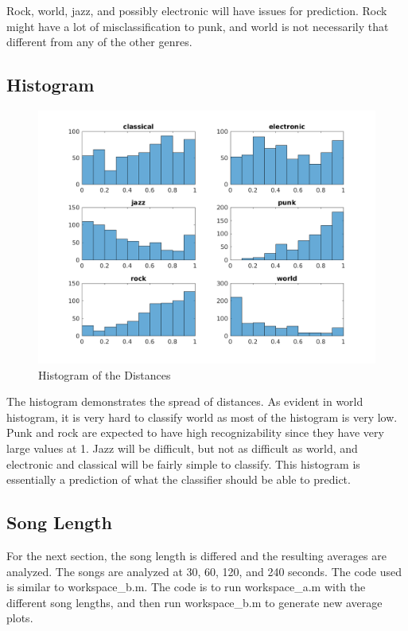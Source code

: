 \documentclass[11pt, a4paper]{article}
\begin{document}
Rock, world, jazz, and possibly electronic will have issues for prediction. Rock might have a lot of misclassification to punk, and world is not necessarily that different from any of the other genres.

\subsection{Histogram}
\begin{figure}[H]
\hspace*{-2cm}    
    \centering
    \includegraphics[width=1.25\textwidth]{histogram.png}
    \caption{Histogram of the Distances}
\end{figure}

The histogram demonstrates the spread of distances. As evident in world histogram, it is very hard to classify world as most of the histogram is very low. Punk and rock are expected to have high recognizability since they have very large values at 1. Jazz will be difficult, but not as difficult as world, and electronic and classical will be fairly simple to classify. This histogram is essentially a prediction of what the classifier should be able to predict. 

\subsection{Song Length}

For the next section, the song length is differed and the resulting averages are analyzed. The songs are analyzed at 30, 60, 120, and 240 seconds. The code used is similar to workspace\_b.m. The code is to run workspace\_a.m with the different song lengths, and then run workspace\_b.m to generate new average plots. 
\end{document}
